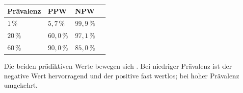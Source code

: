 \begin{aufgabe}
\begin{center}
\renewcommand{\arraystretch}{1.48}
\begin{tabular}{@{}P{2.2cm}P{2.0cm}P{2.0cm}P{2.0cm}@{}}
\toprule
\textbf{Prävalenz} & \textbf{PPW} & \textbf{NPW} & \\
\midrule
$1\,\%$ & $5{,}7\,\%$ & $99{,}9\,\%$ & \\
$20\,\%$ & $60{,}0\,\%$ & $97{,}1\,\%$ & \\
$60\,\%$ & $90{,}0\,\%$ & $85{,}0\,\%$ & \\
\bottomrule
\end{tabular}
\end{center}

Die beiden prädiktiven Werte bewegen sich . Bei niedriger Prävalenz ist der negative Wert hervorragend und der positive fast wertlos; bei hoher Prävalenz umgekehrt.

\begin{center}
\begin{minipage}{0.86\textwidth}
\end{minipage}
\end{center}
\end{aufgabe}

